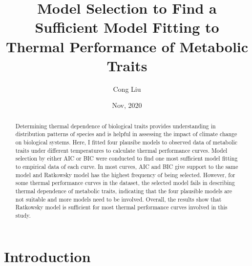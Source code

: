 \documentclass[11pt]{article}
\title{Model Selection to Find a Sufficient Model Fitting to Thermal Performance of Metabolic Traits\footnotemark[1]}
\author{Cong Liu\footnotemark[2]}
\date{Nov, 2020}
\begin{document}
  \maketitle
  \newpage
    
  \linenumbers
  \begin{abstract}
    Determining thermal dependence of biological traits provides understanding in distribution patterns of species 
    and is helpful in assessing the impact of climate change on biological systems. Here, I fitted 
    four plausibe models to observed data of metabolic traits under different 
    temperatures to calculate thermal performance curves. Model selection by either AIC or BIC were 
    conducted to find one most sufficient model fitting to empirical data of each curve. 
    In most curves, AIC and BIC give support to 
    the same model and Ratkowsky model has the highest frequency of being selected. 
    However, for some thermal performance curves in the dataset, the selected model 
    fails in describing thermal dependence of metabolic traits, indicating that the four plausible models 
    are not suitable and more models need to be involved. Overall, the results show that Ratkowsky model is sufficient 
    for most thermal performance curves involved in this study.

  \end{abstract}

  \section{Introduction}
\end{document}
